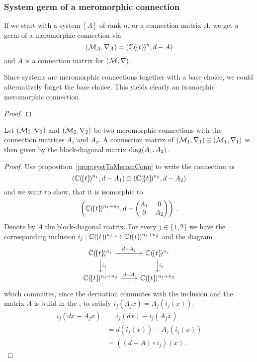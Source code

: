 \subsubsection{System \rightarrow{} germ of a meromorphic connection}
\begin{prop}\label{prop:systToMeromConn}
  If we start with a system $[A]$ of rank $n$, or a connection matrix $A$, we
  get a germ of a meromorphic connection via
  \[
    (\mathcal{M}_A,\nabla_A)=(\mathbb{C}(\!\{t\}\!)^n,d-A)
  \]
  and $A$ is a connection matrix for $(\mathcal{M},\nabla)$.
  \begin{s-rem}
    Since systems are meromorphic connections together with a base choice, we
    could alternatively forget the base choice. This yields clearly an
    isomorphic meromorphic connection.
  \end{s-rem}
\end{prop}
\begin{proof}
  \TODO{}
\end{proof}


\begin{prop}
  Let $(\mathcal{M}_1,\nabla_1)$ and $(\mathcal{M}_2,\nabla_2)$ be two meromorphic
  connections
  with the connection matrices $A_1$ and $A_2$.
  A connection matrix of $(\mathcal{M}_1,\nabla_1)\oplus(\mathcal{M}_1,\nabla_1)$ is then
  given
  by the block-diagonal matrix $\operatorname{diag}(A_1,A_2)$.
\end{prop}
\begin{proof}
  Use proposition~\ref{prop:systToMeromConn} to write the connection as
  \[
    (\mathbb{C}(\!\{t\}\!)^{n_1},d-A_1)\oplus(\mathbb{C}(\!\{t\}\!)^{n_2},d-A_2)
  \]
  and we want to show, that it is isomorphic to
  \[
    \left(\mathbb{C}(\!\{t\}\!)^{n_1+n_2},d-
    \begin{pmatrix} A_1 & 0 \\0 & A_2 \end{pmatrix}\right) \,.
  \]
  Denote by $A$ the block-diagonal matrix.
  For every $j\in\{1,2\}$ we have the corresponding inclusion
  $i_j:\mathbb{C}(\!\{t\}\!)^{n_j}\hookrightarrow\mathbb{C}(\!\{t\}\!)^{n_1+n_2}$ and the
  diagram
  \[ \begin{tikzcd}
      \C(\!\{t\}\!)^{n_j} \rar{d-A_j}\dar{i_j} & \C(\!\{t\}\!)^{n_j} \dar{i_j}
    \\\C(\!\{t\}\!)^{n_1+n_2} \rar{d-A} & \C(\!\{t\}\!)^{n_1+n_2}
  \end{tikzcd} \]
  which commutes, since the derivation commutes with the inclusion and the
  matrix $A$ is build in the , to satisfy
  $i_j(A_jx)=A_j(i_j(x))$:
  \begin{align*}
    i_j(dx-A_jx) &= i_j(dx)-i_j(A_jx)
    \\&=d(i_j(x))-A_j(i_j(x))
    \\&=((d-A)\circ i_j)(x) \,.
  \end{align*}
\end{proof}

